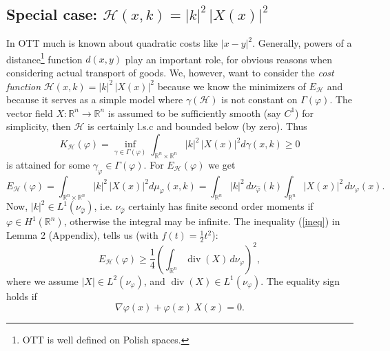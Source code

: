 \documentclass[12pt,a4paper]{article}
\newcommand{\RR}[1]{\mathbb{R}^#1}
\newcommand{\HH}{\mathcal{H}}
\begin{document}
\subsection{Special case: $\HH(x,k)=|k|^2\,|X(x)|^2$}
In OTT much is known about quadratic costs like $|x-y|^2$. Generally, powers of
a distance\footnote{OTT is well defined on Polish spaces.} 
function $d(x,y)$ play an important role, for obvious reasons when
considering actual transport of goods. We, however, want to consider the {\sl 
cost function}  $\HH(x,k)=|k|^2\,|X(x)|^2$ because we know the minimizers of
$E_{\HH}$ and because it serves as a simple model where $\gamma({\HH})$ is
not constant on $\Gamma(\varphi)$. The vector field 
$X:{\RR n}\rightarrow {\RR n}$ is assumed to be sufficiently smooth (say $C^1$)
for simplicity, then $\HH$ is certainly l.s.c and bounded below (by zero).
Thus 
\begin{displaymath}
   K_{\HH}(\varphi) = \inf_{\gamma\in\Gamma(\varphi)} \int_{{\RR n}\times {\RR n}} 
      |k|^2\,|X(x)|^2 d\gamma(x,k) \geq 0
\end{displaymath}
is attained for some $\gamma_{\varphi}\in\Gamma(\varphi)$. For $E_{\HH}(\varphi)$ we
get
\begin{displaymath}
   E_{\HH}(\varphi) =   \int_{{\RR n}\times {\RR n}} 
      |k|^2\,|X(x)|^2 d\mu_{\varphi}(x,k) = \int_{\RR n} |k|^2\, 
        d\nu_{\hat\varphi}(k) \int_{\RR n} |X(x)|^2\,d\nu_{\varphi}(x).
\end{displaymath}
Now, $|k|^2\in L^1(\nu_{\hat\varphi})$, i.e. $\nu_{\hat\varphi}$ certainly has finite
second order moments if $\varphi\in H^1(\RR n)$, otherwise the integral may be
infinite. The inequality (\ref{ineq}) in Lemma 2 (Appendix), tells us (with 
$f(t)=\frac{1}{2} t^2$):
\begin{displaymath}
    E_{\HH}(\varphi) \geq \frac{1}{4} \left(\int_{\RR n} 
         \operatorname{div}(X)\,d\nu_\varphi \right)^2,
\end{displaymath}   
where we assume $|X|\in L^2(\nu_\varphi)$, and 
$\operatorname{div}(X)\in L^1(\nu_\varphi)$. The equality sign holds if
\begin{displaymath}
    \nabla\varphi(x)+\varphi(x)\,X(x) = 0.    
\end{displaymath} 
\end{document}
